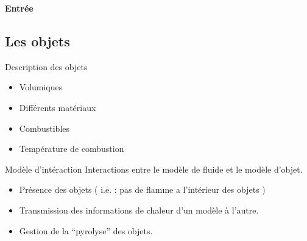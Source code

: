 \documentclass{beamer}
\begin{document}
\begin{frame}
  \begin{center}
    \textbf{Entrée}
  \end{center}
\end{frame}



\subsection{Les objets}


\begin{frame}{Description des objets}
  \begin{itemize}
  \item Volumiques
  \item Différents matériaux
  \item Combustibles
  \item Température de combustion
  \end{itemize}
\end{frame}


\begin{frame}{Modèle d'intéraction}
  Interactions entre le modèle de fluide et le modèle d'objet.
  \begin{itemize}
  \item Présence des objets ( i.e. : pas de flamme a l'intérieur des objets )
  \item Transmission des informations de chaleur d'un modèle à l'autre.
  \item Gestion de la ``pyrolyse'' des objets.
  \end{itemize}
\end{frame}
\end{document}
